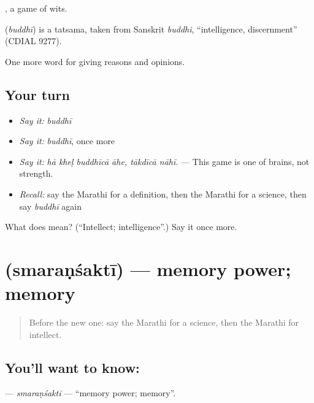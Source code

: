  , a game of wits.

\begin{cousinweb}
\textbf{} (\emph{buddhī}) is a tatsama, taken from Sanskrit \emph{buddhi}, \textquotedblleft{}intelligence, discernment\textquotedblright{} (CDIAL 9277).
\end{cousinweb}

\begin{grammarlens}[title={What you've built}]
One more word for giving reasons and opinions.
\end{grammarlens}

\subsection*{Your turn}
\begin{itemize}
\raggedright
  \item \emph{Say it:} \emph{buddhī}
  \item \emph{Say it:} \emph{buddhī}, once more
  \item \emph{Say it:} \emph{hā kheḷ buddhīcā āhe, tākdīcā nāhī.} — This game is one of brains, not strength.
  \item \emph{Recall:} say the Marathi for a definition, then the Marathi for a science, then say \emph{buddhī} again
\end{itemize}

\begin{tcolorbox}[breakable,colback=teal!4,colframe=teal!35!black,title={Before you move on}]
What does  mean? (\textquotedblleft{}Intellect; intelligence\textquotedblright{}.) Say it once more.
\end{tcolorbox}
\section[\texorpdfstring{\mr{स्मरणशक्ती} (smaraṇśaktī)}{स्मरणशक्ती (smaraṇśaktī)}]{ (smaraṇśaktī) — memory power; memory}

\label{lesson:MR-C375-smaransakti}



\begin{quote}
Before the new one: say the Marathi for a science, then the Marathi for intellect.
\end{quote}

\subsection*{You'll want to know: }
\textbf{} — \emph{smaraṇśaktī} — \textquotedblleft{}memory power; memory\textquotedblright{}.

